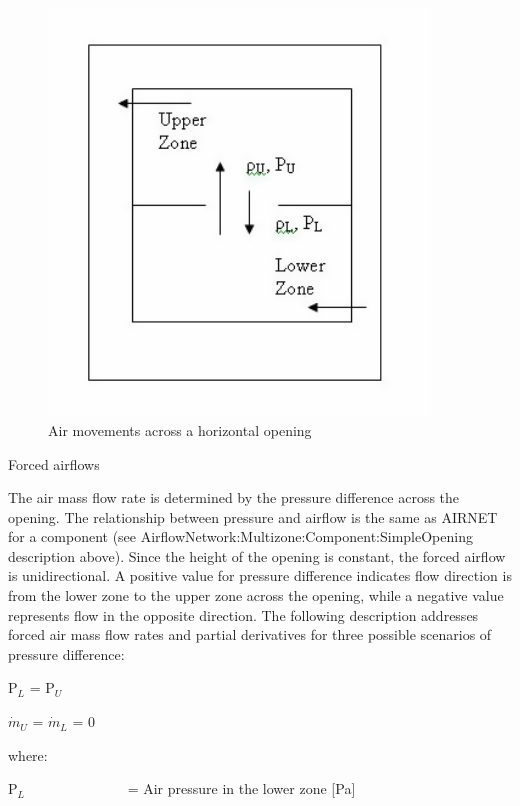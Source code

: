 \begin{figure}[hbtp] %
\centering
\includegraphics[width=0.9\textwidth, height=0.9\textheight, keepaspectratio=true]{media/image2716.png}
\caption{Air movements across a horizontal opening \protect \label{fig:air-movements-across-a-horizontal-opening}}
\end{figure}

Forced airflows

The air mass flow rate is determined by the pressure difference across the opening. The relationship between pressure and airflow is the same as AIRNET for a component (see AirflowNetwork:Multizone:Component:SimpleOpening description above). Since the height of the opening is constant, the forced airflow is unidirectional. A positive value for pressure difference indicates flow direction is from the lower zone to the upper zone across the opening, while a negative value represents flow in the opposite direction. The following description addresses forced air mass flow rates and partial derivatives for three possible scenarios of pressure difference:

P\(_{L}\) = P\(_{U}\)

\({\dot m_U}\) = \({\dot m_L}\) = 0

where:

P\(_{L}\)~~~~~~~~~~~~~~ = Air pressure in the lower zone {[}Pa{]}

